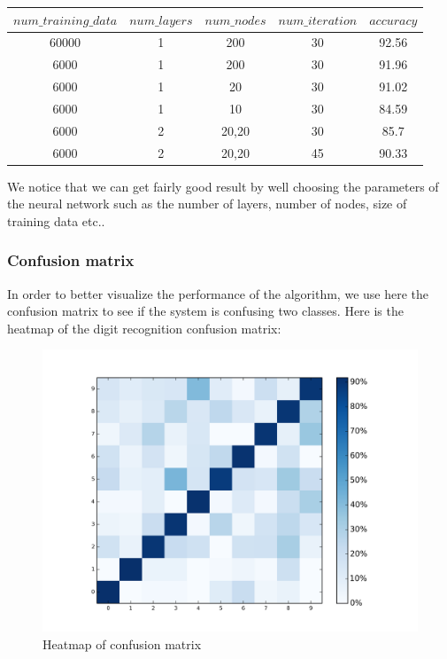 \documentclass[paper=a4, french, 11pt]{scrartcl}
\begin{document}
\begin{table}[h]
\centering
\begin{small}
	\begin{tabular}{ |c|c|c|c|c| }
	\hline
	$num\_training\_data$ & $num\_layers$ & $num\_nodes$ & $num\_iteration$ & $accuracy$ \\
	\hline
	60000 & 1 & 200  & 30 & 92.56 \\
	\hline
	6000 & 1 & 200  & 30 & 91.96 \\
	\hline
	6000 & 1 & 20  & 30 & 91.02 \\
	\hline
	6000	 & 1 & 10  & 30 & 84.59 \\
	\hline
	6000 & 2 & 20,20  & 30 & 85.7\\
	\hline
	6000 & 2 & 20,20  & 45 & 90.33\\
	\hline
	\end{tabular}
\end{small}
\end{table}

We notice that we can get fairly good result by well choosing the parameters of the neural network such as the number of layers, number of nodes, size of training data etc.. 

\subsubsection{Confusion matrix} \mbox{} \vspace{-0.5cm}

In order to better visualize the performance of the algorithm, we use here the confusion matrix to see if the system is confusing two classes. Here is the heatmap of the digit recognition confusion matrix:

\begin{figure}[h]
\vspace{-1ex}
\begin{center}
   \includegraphics[width=1.0\linewidth]{Confusion_matrix_digital.png}
\end{center}
\vspace{-3ex}
\caption{Heatmap of confusion matrix}
\label{fig:heatmap}
\end{figure}
\end{document}
